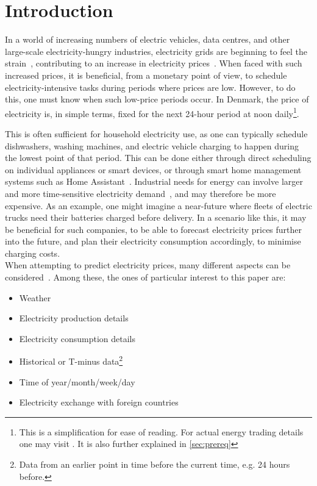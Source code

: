 \section{Introduction} \label{sec:introduction}
In a world of increasing numbers of electric 
vehicles, data centres, and other 
large-scale electricity-hungry industries, electricity grids are beginning to 
feel the strain~\cite{ppm-gridImpact}, contributing to an increase in 
electricity prices~\cite{gridStrainIncreasingGraph}. When faced with such 
increased prices, it is beneficial, from a monetary point of view, to schedule 
electricity-intensive tasks during periods where 
prices are low. However, to do 
this, one must know when such low-price periods occur. In Denmark, the price of 
electricity is, in simple terms, fixed for the next 24-hour period at noon 
daily\footnote{This is a simplification for ease of reading. For actual energy 
trading details one may visit \cite{nordpoolTrading}. It is also further 
explained in \autoref{sec:prereq}}. 

This is often sufficient for household electricity use, as one can typically 
schedule dishwashers, washing machines, and electric vehicle charging to happen 
during the lowest point of that period. This can be done either through direct 
scheduling on individual appliances or smart devices, or through smart home 
management systems such as Home Assistant~\cite{homeAssistant}. Industrial 
needs for energy can involve larger and more time-sensitive electricity 
demand~\cite{industrialHouseholdEnergyConsumption}, and may therefore be more 
expensive. As an example, one might imagine a near-future where fleets of 
electric trucks need their batteries charged before delivery. In a scenario 
like this, it may be beneficial for such companies, to be able to forecast 
electricity prices further into the future, and plan their electricity 
consumption accordingly, to minimise charging 
costs. \\

When attempting to predict electricity prices, many different aspects can be 
considered~\cite{forecastInput}. Among these, the ones of particular interest 
to this paper are: 
\begin{itemize}
	\item Weather
	\item Electricity production details
	\item Electricity consumption details
	\item Historical or T-minus data\footnote{Data 
	from an earlier point in 
	time before the current time, e.g. 24 hours before.}
	\item Time of year/month/week/day
	\item Electricity exchange with foreign countries
\end{itemize}

